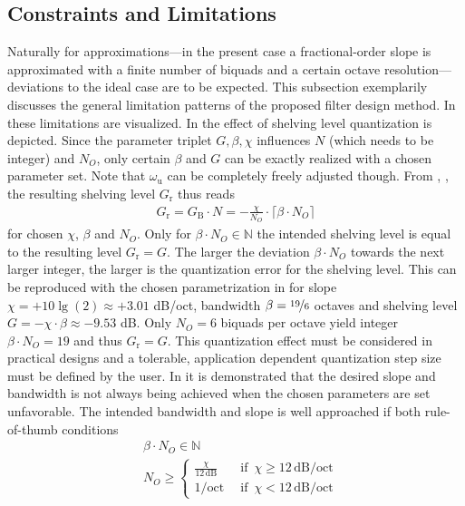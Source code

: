 \subsection{Constraints and Limitations}
%
Naturally for approximations---in the present case a fractional-order
slope is approximated with a finite number of biquads and a certain octave
resolution---deviations to the ideal case are to be expected.
%
This subsection exemplarily discusses the general limitation patterns of the
proposed filter design method.
%
In  these limitations are
visualized.
%
In  the effect of shelving level quantization is depicted.
%
Since the parameter triplet $G, \beta, \chi$ influences $N$ (which
needs to be integer) and $N_O$, only certain $\beta$ and $G$ can be exactly realized with
a chosen parameter set.
%
Note that $\omega_\mathrm{u}$ can be completely freely adjusted though.
%
From , , the resulting shelving
level $G_\mathrm{r}$ thus reads
\begin{align}
G_\mathrm{r} = G_\mathrm{B} \cdot N  = - \frac{\chi}{N_{O}} \cdot
\lceil \beta \cdot N_{O} \rceil
\end{align}
for chosen $\chi$, $\beta$ and $N_O$.
%
Only for $\beta \cdot N_{O}\in\mathbb{N}$ the intended shelving level is equal to
the resulting level $G_\mathrm{r} = G$.
%
The larger the deviation $\beta \cdot N_{O}$ towards the next larger integer,
the larger is the quantization error for the shelving level.
%
This can be reproduced with the chosen parametrization in 
for slope
$\chi = +10\lg(2) \approx +3.01$ dB/oct,
bandwidth $\beta=\nicefrac{19}{6}$ octaves and shelving level
$G= - \chi \cdot \beta \approx - 9.53$ dB.
%
Only $N_O = 6$ biquads per octave yield integer $\beta \cdot N_{O} = 19$
and thus $G_\mathrm{r} = G$.
%
This quantization effect must be considered in practical designs and
a tolerable, application dependent quantization step size must be defined by the
user.
%
\NewL In  it is demonstrated that the desired slope and
bandwidth is not always being achieved when the chosen parameters are set
unfavorable.
%
The intended bandwidth and slope is well approached if both rule-of-thumb
conditions
\begin{align}
\label{eq:bchiNO_cond}
&\beta \cdot N_O \in \mathbb{N}\\\nonumber
&N_O \geq
\begin{cases}
\frac{\chi}{12\,\mathrm{dB}} &\,\,\,\mathrm{if}\,\,\,\chi \geq 12 \, \mathrm{dB/oct}\\
1 / \mathrm{oct} &\,\,\,\mathrm{if}\,\,\,\chi < 12 \, \mathrm{dB/oct}
\end{cases}
\end{align}

